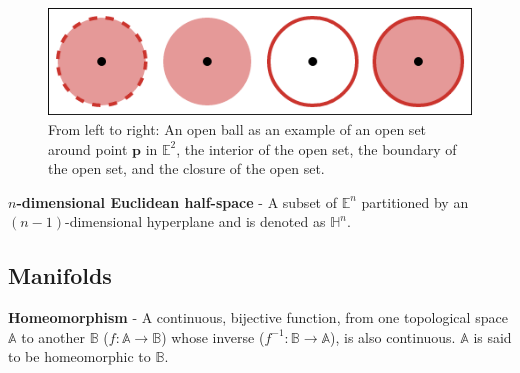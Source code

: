 \begin{figure}[b]
  \centering
  \includegraphics[width=.75\textwidth]{figs/chap2/openSet}
  \caption[Open ball as an example of an open set]{From left to right: An open
  ball as an example of an open set around point
  $\mathbf{p}$ in $\mathbb{E}^2$, the interior of the open set, the boundary of
  the open set, and the closure of the open set.}
  \label{fig:sets}
\end{figure}


\begin{defn}
  \textbf{$n$-dimensional Euclidean half-space} - A subset of $\mathbb{E}^n$
  partitioned by an $(n-1)$-dimensional hyperplane and is denoted
  as $\mathbb{H}^n$.
\end{defn}



\subsection{Manifolds}

\begin{defn}
  \textbf{Homeomorphism} - A continuous, bijective function, from one
  topological space $\mathbb{A}$ to another $\mathbb{B}$ ($f :\mathbb{A}
  \rightarrow \mathbb{B}$) whose inverse ($f^{-1}: \mathbb{B}
  \rightarrow \mathbb{A}$), is also continuous.
  $\mathbb{A}$ is said to be homeomorphic to $\mathbb{B}$.
\end{defn}

